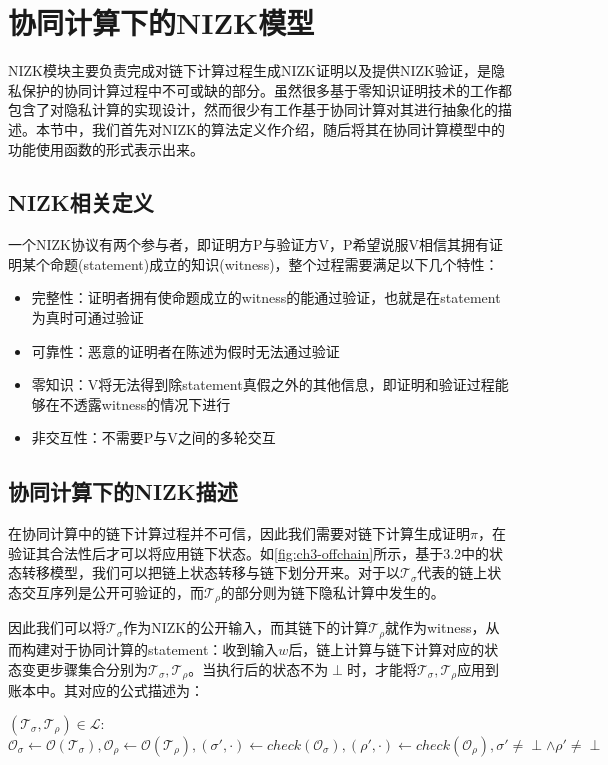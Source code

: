 \section{协同计算下的NIZK模型}
NIZK模块主要负责完成对链下计算过程生成NIZK证明以及提供NIZK验证，是隐私保护的协同计算过程中不可或缺的部分。虽然很多基于零知识证明技术的工作都包含了对隐私计算的实现设计，然而很少有工作基于协同计算对其进行抽象化的描述。本节中，我们首先对NIZK的算法定义作介绍，随后将其在协同计算模型中的功能使用函数的形式表示出来。

\subsection{NIZK相关定义}
一个NIZK协议有两个参与者，即证明方P与验证方V，P希望说服V相信其拥有证明某个命题(statement)成立的知识(witness)，整个过程需要满足以下几个特性：
\begin{itemize}
    \setlength{\itemsep}{0pt}
    \setlength{\parsep}{0pt}
    \setlength{\parskip}{0pt}
\item 完整性：证明者拥有使命题成立的witness的能通过验证，也就是在statement为真时可通过验证
\item 可靠性：恶意的证明者在陈述为假时无法通过验证
\item 零知识：V将无法得到除statement真假之外的其他信息，即证明和验证过程能够在不透露witness的情况下进行
\item 非交互性：不需要P与V之间的多轮交互
\end{itemize}

\subsection{协同计算下的NIZK描述}
在协同计算中的链下计算过程并不可信，因此我们需要对链下计算生成证明$\pi$，在验证其合法性后才可以将应用链下状态。如\autoref{fig:ch3-offchain}所示，基于3.2中的状态转移模型，我们可以把链上状态转移与链下划分开来。对于以$\mathcal{T}_\sigma$代表的链上状态交互序列是公开可验证的，而$\mathcal{T}_\rho$的部分则为链下隐私计算中发生的。

因此我们可以将$\mathcal{T}_\sigma$作为NIZK的公开输入，而其链下的计算$\mathcal{T}_\rho$就作为witness，从而构建对于协同计算的statement：收到输入$w$后，链上计算与链下计算对应的状态变更步骤集合分别为$\mathcal{T}_\sigma, \mathcal{T}_\rho$。当执行后的状态不为$\perp$时，才能将$\mathcal{T}_\sigma, \mathcal{T}_\rho$应用到账本中。其对应的公式描述为：
\begin{center}
    $(\mathcal{T}_\sigma, \mathcal{T}_\rho) \in \mathcal{L}:$ \newline $\mathcal{O}_\sigma \leftarrow \mathcal{O}(\mathcal{T}_\sigma), \mathcal{O}_\rho \leftarrow \mathcal{O}(\mathcal{T}_\rho), (\sigma', \cdot) \leftarrow check(\mathcal{O}_\sigma), (\rho', \cdot) \leftarrow check(\mathcal{O}_\rho), \sigma' \neq \perp \wedge \rho' \neq \perp$
\end{center}


